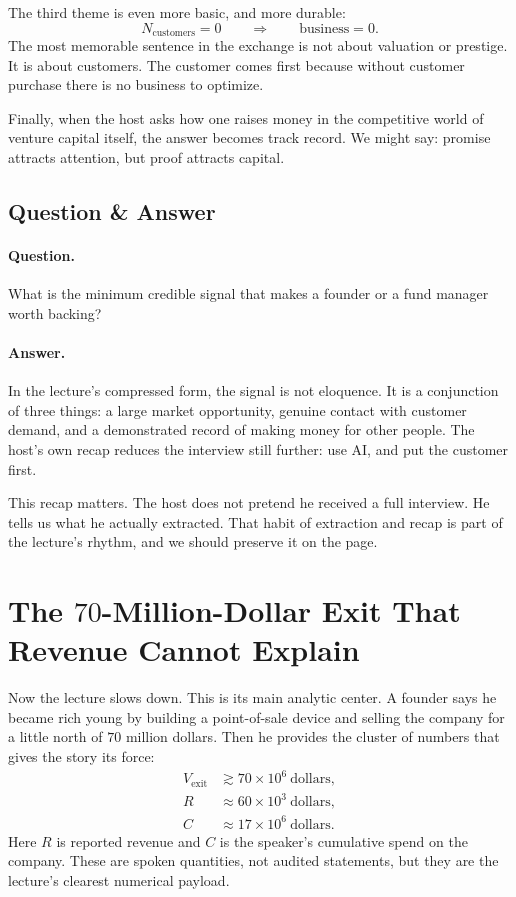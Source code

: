 The third theme is even more basic, and more durable:
\begin{equation}
N_{\text{customers}} = 0
\qquad \Longrightarrow \qquad
\text{business} = 0.
\end{equation}
The most memorable sentence in the exchange is not about valuation or prestige. It is about customers. The customer comes first because without customer purchase there is no business to optimize.

Finally, when the host asks how one raises money in the competitive world of venture capital itself, the answer becomes track record. We might say: promise attracts attention, but proof attracts capital.

\subsection{Question \& Answer}

\paragraph{Question.} What is the minimum credible signal that makes a founder or a fund manager worth backing?

\paragraph{Answer.} In the lecture's compressed form, the signal is not eloquence. It is a conjunction of three things: a large market opportunity, genuine contact with customer demand, and a demonstrated record of making money for other people. The host's own recap reduces the interview still further: use AI, and put the customer first.

This recap matters. The host does not pretend he received a full interview. He tells us what he actually extracted. That habit of extraction and recap is part of the lecture's rhythm, and we should preserve it on the page.

\section{The \(70\)-Million-Dollar Exit That Revenue Cannot Explain}

Now the lecture slows down. This is its main analytic center. A founder says he became rich young by building a point-of-sale device and selling the company for a little north of \(70\) million dollars. Then he provides the cluster of numbers that gives the story its force:
\begin{align}
V_{\text{exit}} &\gtrsim 70 \times 10^6 \ \text{dollars},\\
R &\approx 60 \times 10^3 \ \text{dollars},\\
C &\approx 17 \times 10^6 \ \text{dollars}.
\end{align}
Here \(R\) is reported revenue and \(C\) is the speaker's cumulative spend on the company. These are spoken quantities, not audited statements, but they are the lecture's clearest numerical payload.

